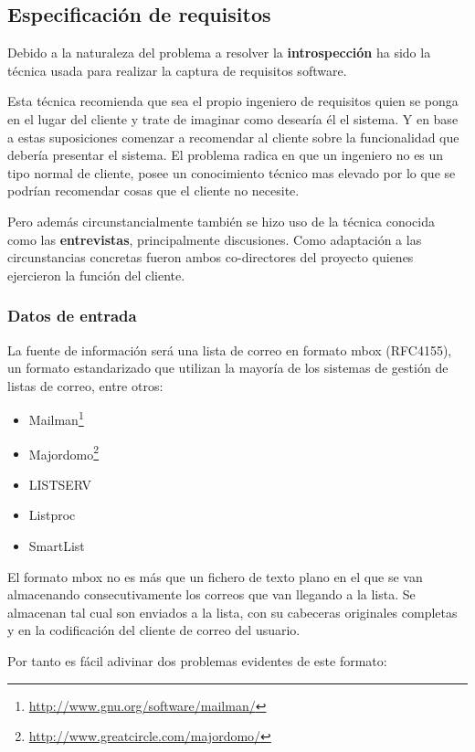
\subsection{Especificación de requisitos}

Debido a la naturaleza del problema a resolver la \textbf{introspección}
ha sido la técnica usada para realizar la captura de requisitos software.

Esta técnica recomienda que sea el propio ingeniero de requisitos quien 
se ponga en el lugar del cliente y trate de imaginar como desearía él el 
sistema. Y en base a estas suposiciones comenzar a recomendar al cliente 
sobre la funcionalidad que debería presentar el sistema. El problema radica 
en  que un ingeniero no es un tipo normal de cliente, posee un conocimiento 
técnico mas elevado por lo que se podrían recomendar cosas que el cliente 
no necesite.

Pero además circunstancialmente también se hizo uso de la técnica conocida
como las \textbf{entrevistas}, principalmente discusiones. Como adaptación
a las circunstancias concretas fueron ambos co-directores del proyecto 
quienes ejercieron la función del cliente.

\subsubsection{Datos de entrada}

La fuente de información será una lista de correo en formato mbox 
(RFC4155\cite{Hall2005}), un formato estandarizado que utilizan la 
mayoría de los sistemas de gestión de listas de correo, entre otros:

\begin{itemize}
 \item Mailman\footnote{\url{http://www.gnu.org/software/mailman/}}
 \item Majordomo\footnote{\url{http://www.greatcircle.com/majordomo/}}
 \item LISTSERV
 \item Listproc
 \item SmartList
\end{itemize}

El formato mbox no es más que un fichero de texto plano en el que se van
almacenando consecutivamente los correos que van llegando a la lista. Se 
almacenan tal cual son enviados a la lista, con su cabeceras originales 
completas y en la codificación del cliente de correo del usuario.

Por tanto es fácil adivinar dos problemas evidentes de este formato:

